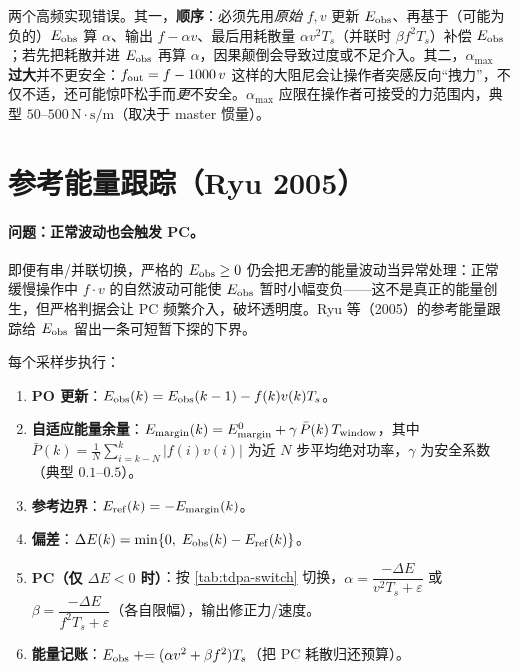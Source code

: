 \begin{pitfall}
两个高频实现错误。其一，\textbf{顺序}：必须先用\emph{原始} $f,v$ 更新 $E_{\rm obs}$、再基于（可能为负的）$E_{\rm obs}$ 算 $\alpha$、输出 $f-\alpha v$、最后用耗散量 $\alpha v^2T_s$（并联时 $\beta f^2T_s$）补偿 $E_{\rm obs}$；若先把耗散并进 $E_{\rm obs}$ 再算 $\alpha$，因果颠倒会导致过度或不足介入。其二，\textbf{$\alpha_{\max}$ 过大}并不更安全：$f_{\rm out}=f-1000\,v$ 这样的大阻尼会让操作者突感反向“拽力”，不仅不适，还可能惊吓松手而\emph{更}不安全。$\alpha_{\max}$ 应限在操作者可接受的力范围内，典型 $50$–$500\,\mathrm{N\cdot s/m}$（取决于 master 惯量）。
\end{pitfall}

\section{参考能量跟踪（Ryu 2005）}
\label{sec:tdpa-ref}

\paragraph{问题：正常波动也会触发 PC。}
即便有串/并联切换，严格的 $E_{\rm obs}\ge0$ 仍会把\emph{无害}的能量波动当异常处理：正常缓慢操作中 $f\cdot v$ 的自然波动可能使 $E_{\rm obs}$ 暂时小幅变负——这不是真正的能量创生，但严格判据会让 PC 频繁介入，破坏透明度。Ryu 等（2005）的参考能量跟踪给 $E_{\rm obs}$ 留出一条可短暂下探的下界。

\begin{algo}[参考能量跟踪 PC]\label{algo:tdpa-ref}
每个采样步执行：
\begin{enumerate}
  \item \textbf{PO 更新}：$E_{\rm obs}(k)=E_{\rm obs}(k-1)-f(k)v(k)T_s$。
  \item \textbf{自适应能量余量}：$E_{\rm margin}(k)=E_{\rm margin}^{0}+\gamma\,\bar P(k)\,T_{\rm window}$，其中 $\bar P(k)=\tfrac1N\sum_{i=k-N}^{k}|f(i)v(i)|$ 为近 $N$ 步平均绝对功率，$\gamma$ 为安全系数（典型 $0.1$–$0.5$）。
  \item \textbf{参考边界}：$E_{\rm ref}(k)=-E_{\rm margin}(k)$。
  \item \textbf{偏差}：$\Delta E(k)=\min\{0,\;E_{\rm obs}(k)-E_{\rm ref}(k)\}$。
  \item \textbf{PC（仅 $\Delta E<0$ 时）}：按 \cref{tab:tdpa-switch} 切换，$\alpha=\dfrac{-\Delta E}{v^2T_s+\varepsilon}$ 或 $\beta=\dfrac{-\Delta E}{f^2T_s+\varepsilon}$（各自限幅），输出修正力/速度。
  \item \textbf{能量记账}：$E_{\rm obs}\mathrel{+}=(\alpha v^2+\beta f^2)T_s$（把 PC 耗散归还预算）。
\end{enumerate}
\end{algo}

